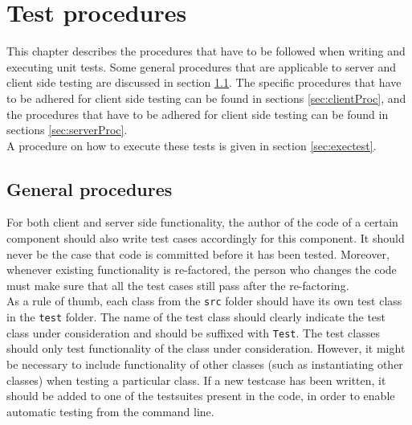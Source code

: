 \chapter{Test procedures}\label{chap:testProc}
This chapter describes the procedures that have to be followed when writing and executing unit tests. Some general procedures that are applicable to server and client side testing are discussed in section \ref{sec:genProc}. The specific procedures that have to be adhered for client side testing can be found in sections \ref{sec:clientProc}, and the procedures that have to be adhered for client side testing can be found in sections \ref{sec:serverProc}.\\
 A procedure on how to execute these tests is given in section \ref{sec:exectest}.

\section{General procedures}\label{sec:genProc}
For both client and server side functionality, the author of the code of a certain component should also write test cases accordingly for this component. It should never be the case that code is committed before it has been tested. Moreover, whenever existing functionality is re-factored, the person who changes the code must make sure that all the test cases still pass after the re-factoring. \\
As a rule of thumb, each class from the \texttt{src} folder should have its own test class in the \texttt{test} folder. The name of the test class should clearly indicate the test class under consideration and should be suffixed with \texttt{Test}. The test classes should only test functionality of the class under consideration. However, it might be necessary to include functionality of other classes (such as instantiating other classes) when testing a particular class.
If a new testcase has been written, it should be added to one of the testsuites present in the code, in order to enable automatic testing from the command line.

